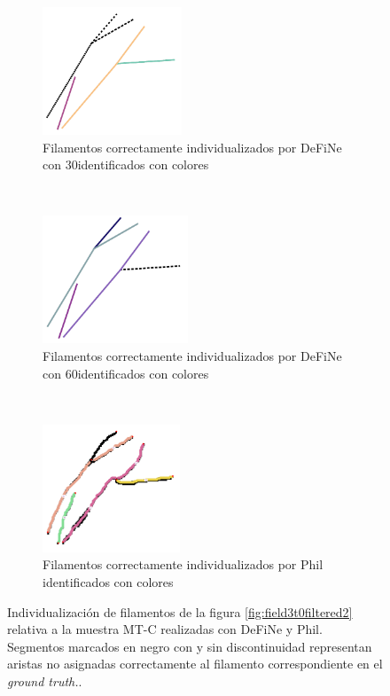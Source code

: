 \begin{figure}[h!]
    \begin{subfigure}[t]{0.3\textwidth}
        \centering
        \includegraphics[height=1.5in]{resultImages/field3-t0-2cellBcrop-filtered-2-DeFiNeExactMatch-30.png}
        \caption{Filamentos correctamente individualizados por DeFiNe con 30\textdegree identificados con colores}
        \label{fig:field3t0filtered2Results-d}
    \end{subfigure}%
    ~ 
    \begin{subfigure}[t]{0.3\textwidth}
        \centering
        \includegraphics[height=1.5in]{resultImages/field3-t0-2cellBcrop-filtered-2-DeFiNeExactMatch-60.png}
        \caption{Filamentos correctamente individualizados por DeFiNe con 60\textdegree identificados con colores}
        \label{fig:field3t0filtered2Results-e}
    \end{subfigure}
    ~ 
    \begin{subfigure}[t]{0.3\textwidth}
        \centering
        \includegraphics[height=1.5in]{resultImages/field3-t0-2cellBcrop-filtered-2-phil-s1271-v05-exactMatch-antLabeled.png}
        \caption{Filamentos correctamente individualizados por Phil identificados con colores}
        \label{fig:field3t0filtered2Results-f}
    \end{subfigure}
    
    \caption{Individualizaci\'on  de filamentos de la figura \ref{fig:field3t0filtered2} relativa a la muestra MT-C realizadas con DeFiNe y Phil. Segmentos marcados en negro con y sin discontinuidad representan aristas no asignadas correctamente al filamento correspondiente en el {\it ground truth.}.}
    \label{fig:field3t0filtered2Results}
\end{figure}


